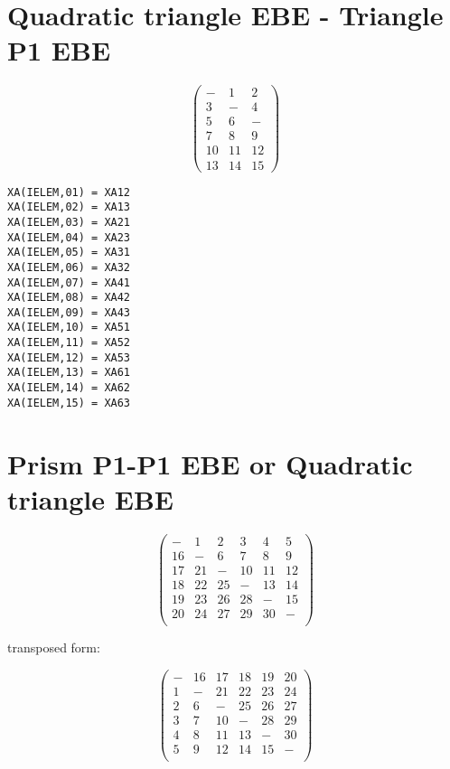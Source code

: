 \section{Quadratic triangle EBE - Triangle P1 EBE}

\[\left(\begin{array}{ccc}
      {-} & {1} & {2} \\
      {3} & {-} & {4} \\
      {5} & {6} & {-} \\
      {7} & {8} & {9} \\
      {10} & {11} & {12} \\
      {13} & {14} & {15}
\end{array}\right) \]

\begin{lstlisting}[language=TelFortran]
XA(IELEM,01) = XA12
XA(IELEM,02) = XA13
XA(IELEM,03) = XA21
XA(IELEM,04) = XA23
XA(IELEM,05) = XA31
XA(IELEM,06) = XA32
XA(IELEM,07) = XA41
XA(IELEM,08) = XA42
XA(IELEM,09) = XA43
XA(IELEM,10) = XA51
XA(IELEM,11) = XA52
XA(IELEM,12) = XA53
XA(IELEM,13) = XA61
XA(IELEM,14) = XA62
XA(IELEM,15) = XA63
\end{lstlisting}

\section{Prism P1-P1 EBE or Quadratic triangle EBE}

\[\left(\begin{array}{cccccc}
      {-}  & {1} & {2} & {3} & {4} & {5} \\
      {16} & {-} & {6} & {7} & {8} & {9} \\
      {17} & {21} & {-} & {10} & {11} & {12} \\
      {18} & {22} & {25} & {-} & {13} & {14} \\
      {19} & {23} & {26} & {28} & {-} & {15} \\
      {20} & {24} & {27} & {29} & {30} & {-} \\
\end{array}\right) \]

transposed form:

\[\left(\begin{array}{cccccc}
      {-}  & {16} & {17} & {18} & {19} & {20} \\
      {1} & {-} & {21} & {22} & {23} & {24} \\
      {2} & {6} & {-} & {25} & {26} & {27} \\
      {3} & {7} & {10} & {-} & {28} & {29} \\
      {4} & {8} & {11} & {13} & {-} & {30} \\
      {5} & {9} & {12} & {14} & {15} & {-} \\
\end{array}\right) \]

